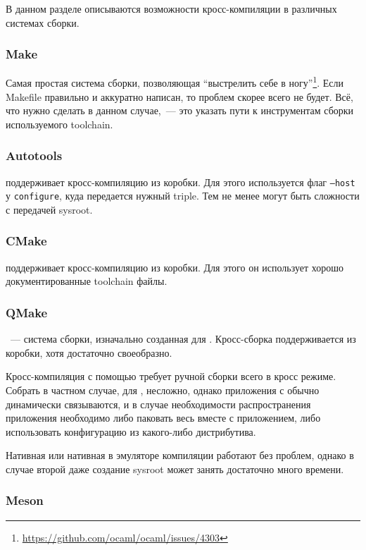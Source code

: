 В данном разделе описываются возможности кросс-компиляции в различных системах сборки.

\subsubsection{Make}

Самая простая система сборки, позволяющая \enquote{выстрелить себе в ногу}\footnote{\url{https://github.com/ocaml/ocaml/issues/4303}}.
Если Makefile правильно и аккуратно написан, то проблем скорее всего не будет.
Всё, что нужно сделать в данном случае,~--- это указать пути к инструментам сборки используемого toolchain.

\subsubsection{Autotools}

\autotools{} поддерживает кросс-компиляцию из коробки.
Для этого используется флаг \texttt{--host} у \texttt{configure}, куда передается нужный triple.
Тем не менее могут быть сложности с передачей sysroot.

\subsubsection{CMake}

\cmake{} поддерживает кросс-компиляцию из коробки.
Для этого он использует хорошо документированные toolchain файлы.

\subsubsection{QMake}

\qmake{}~--- система сборки, изначально созданная для \qt{}.
Кросс-сборка поддерживается из коробки, хотя достаточно своеобразно.

Кросс-компиляция с помощью \qmake{} требует ручной сборки всего \qt{} в кросс режиме.
Собрать \qt{} в частном случае, для \ci{}, несложно, однако приложения с \qt{} обычно динамически связываются, и в случае необходимости распространения приложения необходимо либо паковать весь \qt{} вместе с приложением, либо использовать конфигурацию из какого-либо дистрибутива.

Нативная или нативная в эмуляторе компиляции работают без проблем, однако в случае второй даже создание sysroot может занять достаточно много времени.

\subsubsection{Meson}

